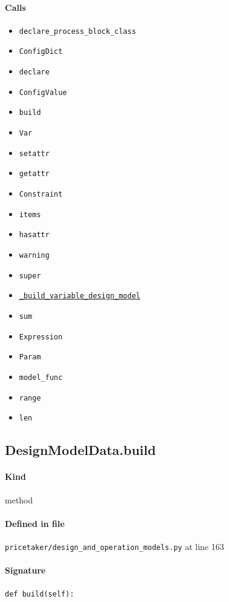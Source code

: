 \documentclass[11pt]{report}
\begin{document}
\paragraph{Calls}
\begin{itemize}[leftmargin=*]
  \item \texttt{declare\_process\_block\_class}
  \item \texttt{ConfigDict}
  \item \texttt{declare}
  \item \texttt{ConfigValue}
  \item \texttt{build}
  \item \texttt{Var}
  \item \texttt{setattr}
  \item \texttt{getattr}
  \item \texttt{Constraint}
  \item \texttt{items}
  \item \texttt{hasattr}
  \item \texttt{warning}
  \item \texttt{super}
  \item \hyperref[def:pricetaker-design_and_operation_models.py:DesignModelData._build_variable_design_model:L209]{\texttt{\_build\_variable\_design\_model}}
  \item \texttt{sum}
  \item \texttt{Expression}
  \item \texttt{Param}
  \item \texttt{model\_func}
  \item \texttt{range}
  \item \texttt{len}
\end{itemize}
\subsection{DesignModelData.build}
\label{def:pricetaker-design_and_operation_models.py:DesignModelData.build:L163}
\paragraph{Kind} method
\paragraph{Defined in file} \texttt{pricetaker/design\_and\_operation\_models.py} at line 163
\paragraph{Signature} \texttt{def build(self):}
\end{document}
